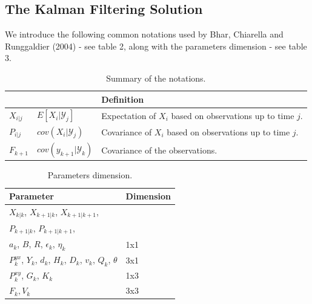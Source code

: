 \documentclass{article}
\theoremstyle{definition}
\theoremstyle{remark}
\newcommand{\filtrationObs}[1]{\ensuremath{\mathscr{Y}_{#1}}}
\begin{document}
\subsection{The Kalman Filtering Solution}
We introduce the following common notations used by Bhar, Chiarella and Runggaldier (2004) - see table 2, along with the parameters dimension - see table 3.
\begin{table}[h!]
  \begin{center}
    \begin{tabular}{ l l p{8.3cm} }
    \hline
		 &  & Definition\\ \hline
		$X_{i|j}$ & $E[X_{i}|\filtrationObs{j}]$ & Expectation of $X_{i}$ based on observations up to time $j$.\\
		$P_{i|j}$ & $cov(X_{i}|\filtrationObs{j})$ & Covariance of $X_i$ based on observations up to time $j$.\\
		$F_{k+1}$ & $cov(y_{k+1}|\filtrationObs{k})$ & Covariance of the observations.\\
    \hline
    \end{tabular}
  \end{center}
  \caption{Summary of the notations.}
\end{table}

\begin{table}[h!]
  \begin{center}
    \begin{tabular}{ p{6cm} p{3cm}}
    \hline
		Parameter & Dimension\\ \hline
		$X_{k|k}$, $X_{k+1|k}$, $X_{k+1|k+1}$, \\$P_{k+1|k}$, $P_{k+1|k+1}$, \\$a_k$, $B$, $R$, $\epsilon_k$, $\eta_k$ & 1x1\\ \hline
		$P^{yx}_k$, $Y_k$, $d_k$, $H_k$, $D_k$, $v_k$, $Q_k$, $\theta$ & 3x1\\ \hline
		$P^{xy}_k$, $G_k$, $K_{k}$ & 1x3\\ \hline
		$F_k, V_k$ & 3x3\\
    \hline
    \end{tabular}
  \end{center}
  \caption{Parameters dimension.}
\end{table}
\end{document}

